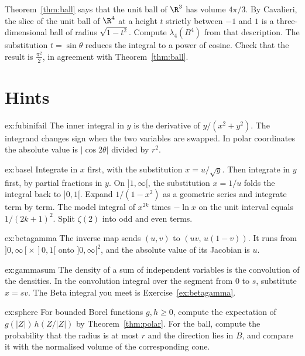 \begin{exercise}[$\star\star\star$]\label{ex:v7c09d}
Theorem~\ref{thm:ball} says that the unit ball of $\R^3$ has volume $4\pi/3$. By Cavalieri, the slice of the unit ball of $\R^4$ at a height $t$ strictly between $-1$ and $1$ is a three-dimensional ball of radius $\sqrt{1-t^2}$. Compute $\lambda_4(B^4)$ from that description. The substitution $t=\sin\theta$ reduces the integral to a power of cosine. Check that the result is $\frac{\pi^2}2$, in agreement with Theorem~\ref{thm:ball}.
\end{exercise}

\section{Hints}

\begin{hint}{ex:fubinifail}
The inner integral in $y$ is the derivative of $y/(x^2+y^2)$. The integrand changes sign when the two variables are swapped. In polar coordinates the absolute value is $|\cos 2\theta|$ divided by $r^2$.
\end{hint}

\begin{hint}{ex:basel}
Integrate in $x$ first, with the substitution $x=u/\sqrt y$. Then integrate in $y$ first, by partial fractions in $y$. On $]1,\infty[$, the substitution $x=1/u$ folds the integral back to $]0,1[$. Expand $1/(1-x^2)$ as a geometric series and integrate term by term. The model integral of $x^{2k}$ times $-\ln x$ on the unit interval equals $1/(2k+1)^2$. Split $\zeta(2)$ into odd and even terms.
\end{hint}

\begin{hint}{ex:betagamma}
The inverse map sends $(u,v)$ to $(uv,\,u(1-v))$. It runs from $]0,\infty[\times\,]0,1[$ onto $]0,\infty[^2$, and the absolute value of its Jacobian is $u$.
\end{hint}

\begin{hint}{ex:gammasum}
The density of a sum of independent variables is the convolution of the densities. In the convolution integral over the segment from $0$ to $s$, substitute $x=sv$. The Beta integral you meet is Exercise~\ref{ex:betagamma}.
\end{hint}

\begin{hint}{ex:sphere}
For bounded Borel functions $g,h\ge 0$, compute the expectation of $g(|Z|)\,h(Z/|Z|)$ by Theorem~\ref{thm:polar}. For the ball, compute the probability that the radius is at most $r$ and the direction lies in $B$, and compare it with the normalised volume of the corresponding cone.
\end{hint}

